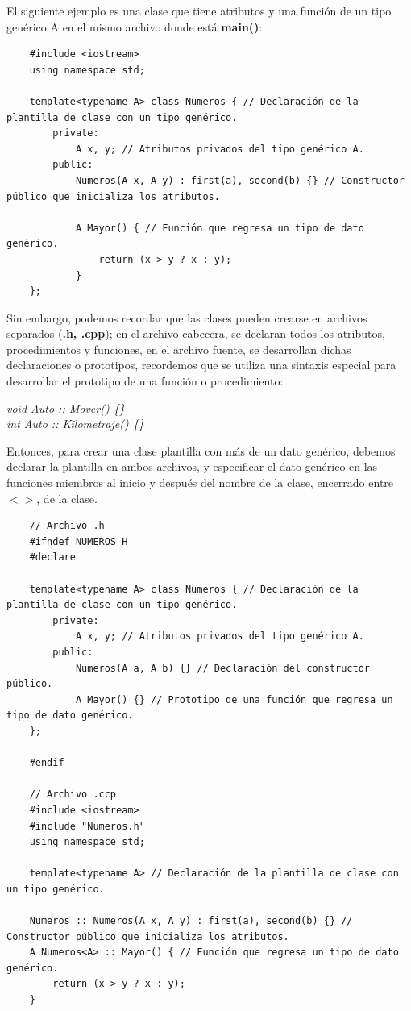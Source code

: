 El siguiente ejemplo es una clase que tiene atributos y una función de un tipo genérico A en el mismo archivo donde está \textbf{main()}:
\begin{lstlisting}
    #include <iostream>
    using namespace std;
    
    template<typename A> class Numeros { // Declaración de la plantilla de clase con un tipo genérico.
        private:
            A x, y; // Atributos privados del tipo genérico A.
        public:
            Numeros(A x, A y) : first(a), second(b) {} // Constructor público que inicializa los atributos.
            
            A Mayor() { // Función que regresa un tipo de dato genérico.
                return (x > y ? x : y);
            }
    };
\end{lstlisting}

Sin embargo, podemos recordar que las clases pueden crearse en archivos separados (\textbf{.h, .cpp}); en el archivo cabecera, se declaran todos los atributos, procedimientos y funciones, en el archivo fuente, se desarrollan dichas declaraciones o prototipos, recordemos que se utiliza una sintaxis especial para desarrollar el prototipo de una función o procedimiento:
\begin{center}
	\textit{
		void Auto :: Mover() \{\} \\
		int Auto :: Kilometraje() \{\}
	}
\end{center}

Entonces, para crear una clase plantilla con más de un dato genérico, debemos declarar la plantilla en ambos archivos, y especificar el dato genérico en las funciones miembros al inicio y después del nombre de la clase, encerrado entre \textbf{$< >$}, de la clase. 
\begin{lstlisting}
    // Archivo .h
    #ifndef NUMEROS_H
    #declare
    
    template<typename A> class Numeros { // Declaración de la plantilla de clase con un tipo genérico.
        private:
            A x, y; // Atributos privados del tipo genérico A.
        public:
            Numeros(A a, A b) {} // Declaración del constructor público.
            A Mayor() {} // Prototipo de una función que regresa un tipo de dato genérico.
    };
    
    #endif
    
    // Archivo .ccp
    #include <iostream>
    #include "Numeros.h"
    using namespace std;
    
    template<typename A> // Declaración de la plantilla de clase con un tipo genérico.
    
    Numeros :: Numeros(A x, A y) : first(a), second(b) {} // Constructor público que inicializa los atributos.
    A Numeros<A> :: Mayor() { // Función que regresa un tipo de dato genérico.
        return (x > y ? x : y);
    }
\end{lstlisting}

